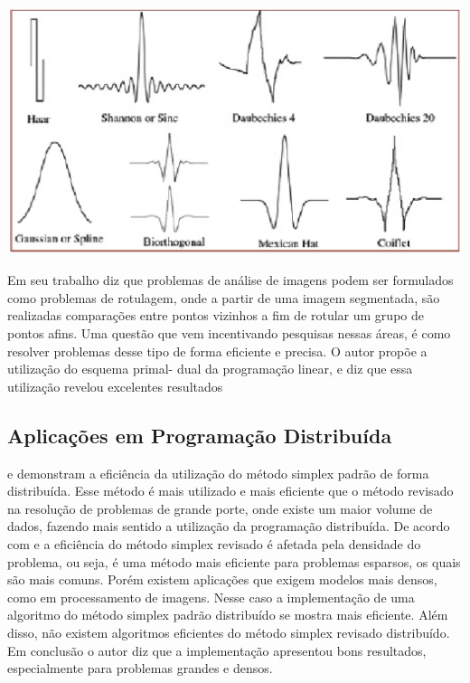 \begin{center}
	\includegraphics[scale=0.5]{graficos/ondaletas}
	\label{img:ondaletas}
 	\cite{FotoWave}
\end{center}

Em seu trabalho  diz que problemas de análise de imagens podem ser formulados como problemas de rotulagem, onde a partir de uma imagem segmentada, são realizadas comparações entre pontos vizinhos a fim de rotular um grupo de pontos afins. Uma questão que vem incentivando pesquisas nessas áreas, é como resolver problemas desse tipo de forma eficiente e precisa. O autor propõe a utilização do esquema primal- dual da programação linear, e diz que essa utilização revelou excelentes resultados

\subsection{Aplicações em Programação Distribuída}
 e  demonstram a eficiência da utilização do método simplex padrão de forma distribuída. Esse método é mais utilizado e mais eficiente que o método revisado na resolução de problemas de grande porte, onde existe um maior volume de dados, fazendo mais sentido a utilização da programação distribuída.
De acordo com  e  a eficiência do método simplex revisado é afetada pela densidade do problema, ou seja, é uma método mais eficiente para problemas esparsos, os quais são mais comuns. Porém existem aplicações que exigem modelos mais densos, como em processamento de imagens. Nesse caso a implementação de uma algoritmo do método simplex padrão distribuído se mostra mais eficiente. Além disso, não existem algoritmos eficientes do método simplex revisado distribuído. Em conclusão o autor diz que a implementação apresentou bons resultados, especialmente para problemas grandes e densos.

